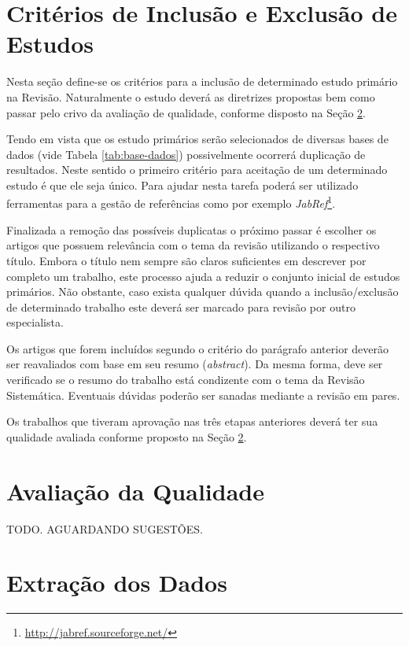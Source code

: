 \documentclass{article}
\begin{document}
\section{Critérios de Inclusão e Exclusão de Estudos}
\label{sec:criterios_in_out}
Nesta seção define-se os critérios para a inclusão de determinado estudo
primário na Revisão. Naturalmente o estudo deverá as diretrizes propostas bem
como passar pelo crivo da avaliação de qualidade, conforme disposto na Seção
\ref{sec:qualidade}.

Tendo em vista que os estudo primários serão selecionados de diversas bases de
dados (vide Tabela \ref{tab:base-dados}) possivelmente ocorrerá duplicação de
resultados. Neste sentido o primeiro critério para aceitação de um determinado
estudo é que ele seja único. Para ajudar nesta tarefa poderá ser utilizado
ferramentas para a gestão de referências como por exemplo
\textit{JabRef}\footnote{\url{http://jabref.sourceforge.net/}}.

Finalizada a remoção das possíveis duplicatas o próximo passar é escolher os
artigos que possuem relevância com o tema da revisão utilizando o respectivo
título. Embora o título nem sempre são claros suficientes em descrever por
completo um trabalho, este processo ajuda a reduzir o conjunto inicial de
estudos primários. Não obstante, caso exista qualquer dúvida quando a
inclusão/exclusão de determinado trabalho este deverá ser marcado para revisão
por outro especialista.

Os artigos que forem incluídos segundo o critério do parágrafo anterior deverão
ser reavaliados com base em seu resumo (\textit{abstract}). Da mesma forma,
deve ser verificado se o resumo do trabalho está condizente com o tema da
Revisão Sistemática. Eventuais dúvidas poderão ser sanadas mediante a revisão
em pares.

Os trabalhos que tiveram aprovação nas três etapas anteriores deverá ter sua
qualidade avaliada conforme proposto na Seção \ref{sec:qualidade}.

\section{Avaliação da Qualidade}
\label{sec:qualidade}

TODO. AGUARDANDO SUGESTÕES.

\section{Extração dos Dados}
\label{sec:extracao_dados}
\end{document}

